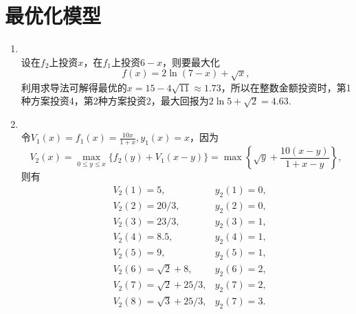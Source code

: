 \section{最优化模型}
\begin{enumerate}[label=\arabic{section}.\arabic*]
    \item \sol\\
    设在$f_2$上投资$x$，在$f_1$上投资$6-x$，则要最大化
    \[f(x)=2\ln(7-x)+\sqrt{x},\]
    利用求导法可解得最优的$\displaystyle x=15-4\sqrt{11} \approx 1.73$，所以在整数金额投资时，第1种方案投资4，第2种方案投资2，最大回报为$2\ln 5+\sqrt{2}=4.63$.
    \item \sol\\
    令$\displaystyle V_1(x)=f_1(x)=\frac{10x}{1+x},y_1(x)=x$，因为
    \[V_2(x)=\max_{0 \leq y \leq x} \{f_2(y)+V_1(x-y)\}=\max\left\{\sqrt{y}+\frac{10(x-y)}{1+x-y}\right\},\]
    则有
    \begin{align*}
        &V_2(1)=5, &y_2(1)=0,\\
        &V_2(2)=20/3, &y_2(2)=0,\\
        &V_2(3)=23/3, & y_2(3)=1,\\
        &V_2(4)=8.5, & y_2(4)=1,\\
        &V_2(5)=9, & y_2(5)=1,\\
        &V_2(6)=\sqrt{2}+8, & y_2(6)=2,\\
        &V_2(7)=\sqrt{2}+25/3, & y_2(7)=2,\\
        &V_2(8)=\sqrt{3}+25/3, & y_2(7)=3.
    \end{align*}

\end{enumerate}
